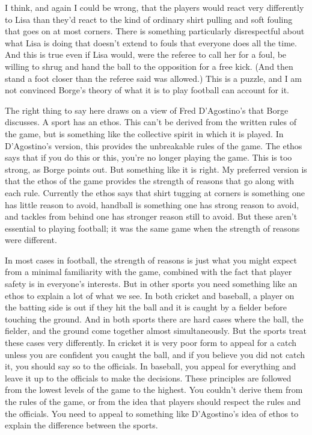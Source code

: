 \documentclass[
  11pt,
  letterpaper,
  DIV=11,
  numbers=noendperiod,
  oneside]{scrartcl}
\begin{document}
I think, and again I could be wrong, that the players would react very
differently to Lisa than they'd react to the kind of ordinary shirt
pulling and soft fouling that goes on at most corners. There is
something particularly disrespectful about what Lisa is doing that
doesn't extend to fouls that everyone does all the time. And this is
true even if Lisa would, were the referee to call her for a foul, be
willing to shrug and hand the ball to the opposition for a free kick.
(And then stand a foot closer than the referee said was allowed.) This
is a puzzle, and I am not convinced Borge's theory of what it is to play
football can account for it.

The right thing to say here draws on a view of Fred D'Agostino's that
Borge discusses. A sport has an ethos.
This can't be derived from the written rules of the game, but is
something like the collective spirit in which it is played. In
D'Agostino's version, this provides the unbreakable rules of the game.
The ethos says that if you do this or this, you're no longer playing the
game. This is too strong, as Borge points out. But something like it is
right. My preferred version is that the ethos of the game provides the
strength of reasons that go along with each rule. Currently the ethos
says that shirt tugging at corners is something one has little reason to
avoid, handball is something one has strong reason to avoid, and tackles
from behind one has stronger reason still to avoid. But these aren't
essential to playing football; it was the same game when the strength of
reasons were different.

In most cases in football, the strength of reasons is just what you
might expect from a minimal familiarity with the game, combined with the
fact that player safety is in everyone's interests. But in other sports
you need something like an ethos to explain a lot of what we see. In
both cricket and baseball, a player on the batting side is out if they
hit the ball and it is caught by a fielder before touching the ground.
And in both sports there are hard cases where the ball, the fielder, and
the ground come together almost simultaneously. But the sports treat
these cases very differently. In cricket it is very poor form to appeal
for a catch unless you are confident you caught the ball, and if you
believe you did not catch it, you should say so to the officials. In
baseball, you appeal for everything and leave it up to the officials to
make the decisions. These principles are followed from the lowest levels
of the game to the highest. You couldn't derive them from the rules of
the game, or from the idea that players should respect the rules and the
officials. You need to appeal to something like D'Agostino's idea of
ethos to explain the difference between the sports.
\end{document}
